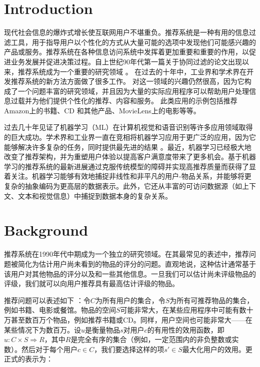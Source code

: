 \documentclass[sigconf]{acmart}
\begin{document}
\maketitle

\section{Introduction}
现代社会信息的爆炸式增长使互联网用户不堪重负。推荐系统是一种有用的信息过滤工具，用于指导用户以个性化的方式从大量可能的选项中发现他们可能感兴趣的产品或服务。推荐系统在各种信息访问系统中发挥着更加重要和重要的作用，以促进业务发展并促进决策过程。自上世纪90年代第一篇关于协同过滤的论文出现以来，推荐系统成为一个重要的研究领域 \cite{hill1995recommending, resnick1994grouplens, shardanand1995social}。 在过去的十年中，工业界和学术界在开发推荐系统的新方法方面做了很多工作。 对这一领域的兴趣仍然很高，因为它构成了一个问题丰富的研究领域，并且因为大量的实际应用程序可以帮助用户处理信息过载并为他们提供个性化的推荐、内容和服务。 此类应用的示例包括推荐 Amazon上的书籍、CD 和其他产品、MovieLens上的电影等等。

过去几十年见证了机器学习（ML）在计算机视觉和语音识别等许多应用领域取得的巨大成功。学术界和工业界一直在竞相将机器学习应用于更广泛的应用，因为它能够解决许多复杂的任务，同时提供最先进的结果 \cite{covington2016deep} 。最近，机器学习已经极大地改变了推荐架构，并为重塑用户体验以提高客户满意度带来了更多机会。基于机器学习的推荐系统的最新进展通过克服传统模型的障碍并实现高推荐质量而获得了显着关注。机器学习能够有效地捕捉非线性和非平凡的用户-物品关系，并能够将更复杂的抽象编码为更高层的数据表示。此外，它还从丰富的可访问数据源（如上下文、文本和视觉信息）中捕捉到数据本身的复杂关系。

\section{Background}

推荐系统在1990年代中期成为一个独立的研究领域。在其最常见的表述中，推荐问题被简化为估计用户尚未看到的物品的评分的问题。直观地说，这种估计通常基于该用户对其他物品的评分以及和一些其他信息。一旦我们可以估计尚未评级物品的评级，我们就可以向用户推荐具有最高估计评级的物品。

推荐问题可以表述如下 \cite{adomavicius2005toward}：令$C$为所有用户的集合，令$S$为所有可推荐物品的集合，例如书籍、电影或餐馆。物品的空间$S$可能非常大，在某些应用程序中可能有数十万甚至数百万个物品，例如推荐书籍或CD。同样，用户空间也可能非常大——在某些情况下为数百万。设$u$是衡量物品$s$对用户$c$的有用性的效用函数，即$u: C \times S \Rightarrow R$，其中$R$是完全有序的集合（例如，一定范围内的非负整数或实数）。然后对于每个用户$c\in C$，我们要选择这样的项$s'\in S$最大化用户的效用。更正式的表示为：
\end{document}
